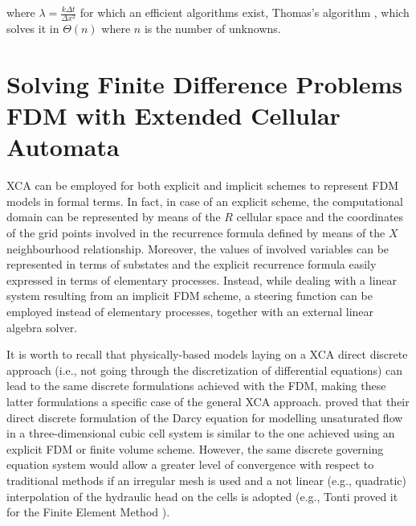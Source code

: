   where $\lambda = \frac{k\Delta t}{\Delta x^2}$ for which an efficient algorithms exist, Thomas's algorithm \cite{Datta:2010,Higham:2002}, which solves it in ${\Theta}(n)$ where $n$ is the number of unknowns.
 


        
\section[Solving FDM with XCA]{Solving Finite Difference Problems FDM with Extended Cellular Automata}
    XCA can be employed for both explicit and implicit schemes to
    represent FDM models in formal terms. In fact, in case of an
    explicit scheme, the computational domain can be represented by
    means of the $R$ cellular space and the coordinates of the grid
    points involved in the recurrence formula defined by means of the
    $X$ neighbourhood relationship. Moreover, the values of involved
    variables can be represented in terms of substates and the
    explicit recurrence formula easily expressed in terms of
    elementary processes. Instead, while dealing with a linear system
    resulting from an implicit FDM scheme, a steering function can be
    employed instead of elementary processes, together with an
    external linear algebra solver.

    It is worth to recall that physically-based models laying on a XCA
    direct discrete approach (i.e., not going through the
    discretization of differential equations) can lead to the same
    discrete formulations achieved with the FDM, making these latter
    formulations a specific case of the general XCA
    approach. \cite{Mendicino2006} proved that
    their direct discrete formulation of the Darcy equation for
    modelling unsaturated flow in a three-dimensional cubic cell
    system is similar to the one achieved using an explicit FDM or
    finite volume scheme. However, the same discrete governing
    equation system would allow a greater level of convergence with
    respect to traditional methods if an irregular mesh is used
    and a not linear (e.g., quadratic) interpolation of the hydraulic
    head on the cells is adopted (e.g., Tonti proved it for the Finite
    Element Method \cite{Tonti2001237}). 






